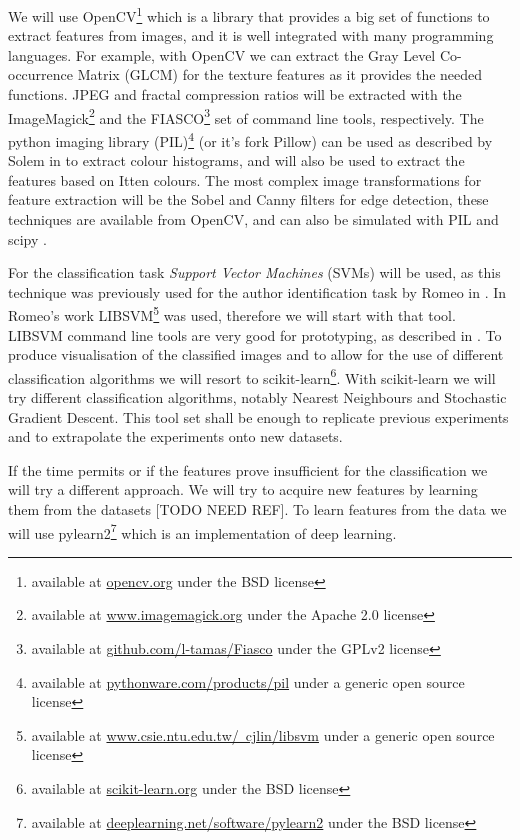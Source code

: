 \documentclass[a4paper]{article}
\begin{document}
We will use OpenCV\footnote{available at \href{http://opencv.org/}{opencv.org}
under the BSD license} which is a library that provides a big set of functions
to extract features from images, and it is well integrated with many
programming languages.  For example, with OpenCV we can extract the Gray Level
Co-occurrence Matrix (GLCM) for the texture features as it provides the needed
functions.  JPEG and fractal compression ratios will be extracted with the
ImageMagick\footnote{available at
\href{http://www.imagemagick.org/}{www.imagemagick.org} under the Apache 2.0
license} and the FIASCO\footnote{available at
\href{http://github.com/l-tamas/Fiasco/}{github.com/l-tamas/Fiasco} under the
GPLv2 license} set of command line tools, respectively.  The python imaging
library (PIL)\footnote{available at
\href{http://pythonware.com/products/pil/}{pythonware.com/products/pil} under a
generic open source license} (or it's fork Pillow) can be used as described by
Solem in \cite{solem12book} to extract colour histograms, and will also be used
to extract the features based on Itten colours.  The most complex image
transformations for feature extraction will be the Sobel and Canny filters for
edge detection, these techniques are available from OpenCV, and can also be
simulated with PIL and scipy \cite{oliphant06numpy}.

For the classification task \emph{Support Vector Machines} (SVMs) will be used,
as this technique was previously used for the author identification task by
Romeo in \cite{rmc12ajs}.  In Romeo's work LIBSVM\footnote{available at
\href{http://www.csie.ntu.edu.tw/~cjlin/libsvm/}
{www.csie.ntu.edu.tw/~cjlin/libsvm} under a generic open source license} was
used, therefore we will start with that tool.  LIBSVM command line tools are
very good for prototyping, as described in \cite{hcl03svm}.  To produce
visualisation of the classified images and to allow for the use of different
classification algorithms we will resort to scikit-learn\footnote{available at
\href{http://scikit-learn.org/}{scikit-learn.org} under the BSD license}.  With
scikit-learn we will try different classification algorithms, notably Nearest
Neighbours and Stochastic Gradient Descent.  This tool set shall be enough to
replicate previous experiments and to extrapolate the experiments onto new
datasets.

If the time permits or if the features prove insufficient for the
classification we will try a different approach.  We will try to acquire new
features by learning them from the datasets [TODO NEED REF].  To learn features
from the data we will use pylearn2\footnote{available at
\href{http://deeplearning.net/software/pylearn2/}
{deeplearning.net/software/pylearn2} under the BSD license} which is an
implementation of deep learning.
\end{document}
